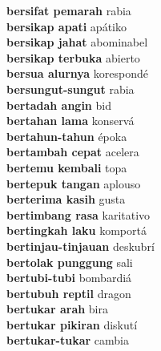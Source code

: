 \textbf{ bersifat pemarah  } rabia \\
\textbf{ bersikap apati  } apátiko \\
\textbf{ bersikap jahat  } abominabel \\
\textbf{ bersikap terbuka  } abierto \\
\textbf{ bersua alurnya  } korespondé \\
\textbf{ bersungut-sungut  } rabia \\
\textbf{ bertadah angin  } bid \\
\textbf{ bertahan lama  } konservá \\
\textbf{ bertahun-tahun  } époka \\
\textbf{ bertambah cepat  } acelera \\
\textbf{ bertemu kembali  } topa \\
\textbf{ bertepuk tangan  } aplouso \\
\textbf{ berterima kasih  } gusta \\
\textbf{ bertimbang rasa  } karitativo \\
\textbf{ bertingkah laku  } komportá \\
\textbf{ bertinjau-tinjauan  } deskubrí \\
\textbf{ bertolak punggung  } sali \\
\textbf{ bertubi-tubi  } bombardiá \\
\textbf{ bertubuh reptil  } dragon \\
\textbf{ bertukar arah  } bira \\
\textbf{ bertukar pikiran  } diskutí \\
\textbf{ bertukar-tukar  } cambia \\
